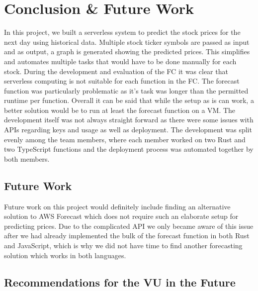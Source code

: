 \chapter{\label{chap:conclusion}Conclusion \& Future Work}

In this project, we built a serverless system to predict the stock prices for
the next day using historical data. Multiple stock ticker symbols are passed as
input and as output, a graph is generated showing the predicted prices. This
simplifies and automates multiple tasks that would have to be done manually for
each stock. During the development and evaluation of the FC it was clear that
serverless computing is not suitable for each function in the FC. The forecast
function was particularly problematic as it's task was longer than the
permitted runtime per function. Overall it can be said that while the setup as
is can work, a better solution would be to run at least the forecast function on
a VM. The development itself was not always straight forward as there were some
issues with APIs regarding keys and usage as well as deployment. The
development was split evenly among the team members, where each member worked
on two Rust and two TypeScript functions and the deployment process was
automated together by both members.



%
%
%
\section{Future Work}

Future work on this project would definitely include finding an alternative
solution to AWS Forecast which does not require such an elaborate setup for
predicting prices.  Due to the complicated API we only became aware of this
issue after we had already implemented the bulk of the forecast function in
both Rust and JavaScript, which is why we did not have time to find another
forecasting solution which works in both languages.



%
%
%
\section{Recommendations for the VU in the Future}

